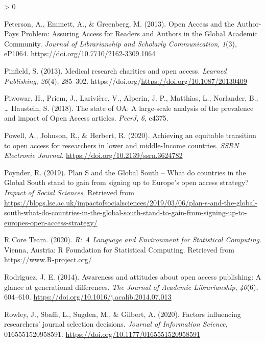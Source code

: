 \documentclass[
  english,
  man]{apa6}
\newlength{\cslhangindent}
\newenvironment{CSLReferences}[2] %
 {%
  \setlength{\parindent}{0pt}
  \ifodd #1 \everypar{\setlength{\hangindent}{\cslhangindent}}\ignorespaces\fi
  \ifnum #2 > 0
  \setlength{\parskip}{#2\baselineskip}
  \fi
 }%
 {}
\begin{document}
\begin{CSLReferences}{1}{0}
\leavevmode\hypertarget{ref-peterson_open_2013}{}%
Peterson, A., Emmett, A., \& Greenberg, M. (2013). Open {Access} and the {Author}-{Pays} {Problem}: {Assuring} {Access} for {Readers} and {Authors} in the {Global} {Academic} {Community}. \emph{Journal of Librarianship and Scholarly Communication}, \emph{1}(3), eP1064. \url{https://doi.org/10.7710/2162-3309.1064}

\leavevmode\hypertarget{ref-pinfield_medical_2013}{}%
Pinfield, S. (2013). Medical research charities and open access. \emph{Learned Publishing}, \emph{26}(4), 285--302. https://doi.org/\url{https://doi.org/10.1087/20130409}

\leavevmode\hypertarget{ref-piwowar_state_2018}{}%
Piwowar, H., Priem, J., Larivière, V., Alperin, J. P., Matthias, L., Norlander, B., \ldots{} Haustein, S. (2018). The state of {OA}: A large-scale analysis of the prevalence and impact of {Open} {Access} articles. \emph{PeerJ}, \emph{6}, e4375.

\leavevmode\hypertarget{ref-powell_achieving_2020}{}%
Powell, A., Johnson, R., \& Herbert, R. (2020). Achieving an equitable transition to open access for researchers in lower and middle-{Income} countries. \emph{SSRN Electronic Journal}. \url{https://doi.org/10.2139/ssrn.3624782}

\leavevmode\hypertarget{ref-poynder_plan_2019}{}%
Poynder, R. (2019). Plan {S} and the {Global} {South} -- {What} do countries in the {Global} {South} stand to gain from signing up to {Europe}'s open access strategy? \emph{Impact of Social Sciences}. Retrieved from \url{https://blogs.lse.ac.uk/impactofsocialsciences/2019/03/06/plan-s-and-the-global-south-what-do-countries-in-the-global-south-stand-to-gain-from-signing-up-to-europes-open-access-strategy/}

\leavevmode\hypertarget{ref-r_core_team_r_2020}{}%
R Core Team. (2020). \emph{R: {A} {Language} and {Environment} for {Statistical} {Computing}}. Vienna, Austria: R Foundation for Statistical Computing. Retrieved from \url{https://www.R-project.org/}

\leavevmode\hypertarget{ref-rodriguez_awareness_2014}{}%
Rodriguez, J. E. (2014). Awareness and attitudes about open access publishing: A glance at generational differences. \emph{The Journal of Academic Librarianship}, \emph{40}(6), 604--610. \url{https://doi.org/10.1016/j.acalib.2014.07.013}

\leavevmode\hypertarget{ref-rowley_factors_2020}{}%
Rowley, J., Sbaffi, L., Sugden, M., \& Gilbert, A. (2020). Factors influencing researchers' journal selection decisions. \emph{Journal of Information Science}, 0165551520958591. \url{https://doi.org/10.1177/0165551520958591}


\end{CSLReferences}
\end{document}

